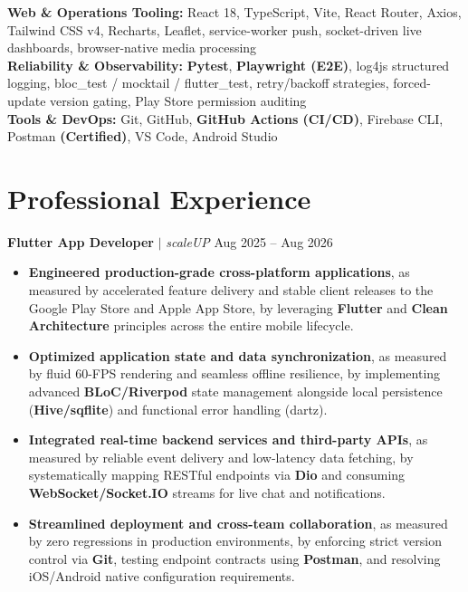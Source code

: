 \documentclass[10pt,letterpaper]{article}
\newenvironment{highlights}{
  \begin{itemize}[topsep=2pt,parsep=1pt,partopsep=0pt,itemsep=0pt,leftmargin=10pt]
}{\end{itemize}}
\begin{document}
\textbf{Web \& Operations Tooling:} React 18, TypeScript, Vite, React Router, Axios, Tailwind CSS v4, Recharts, Leaflet, service-worker push, socket-driven live dashboards, browser-native media processing \\[2pt]
\textbf{Reliability \& Observability:} \textbf{Pytest}, \textbf{Playwright (E2E)}, log4js structured logging, bloc\_test / mocktail / flutter\_test, retry/backoff strategies, forced-update version gating, Play Store permission auditing \\[2pt]
\textbf{Tools \& DevOps:} Git, GitHub, \textbf{GitHub Actions (CI/CD)}, Firebase CLI, Postman \textbf{(Certified)}, VS Code, Android Studio

\vspace{5pt}

\section{Professional Experience}

\textbf{Flutter App Developer} $|$ \textit{scaleUP} \hfill Aug 2025 -- Aug 2026\\
\vspace{-8pt}
\begin{highlights}
  \item \textbf{Engineered production-grade cross-platform applications}, as measured by accelerated feature delivery and stable client releases to the Google Play Store and Apple App Store, by leveraging \textbf{Flutter} and \textbf{Clean Architecture} principles across the entire mobile lifecycle.
  \item \textbf{Optimized application state and data synchronization}, as measured by fluid 60-FPS rendering and seamless offline resilience, by implementing advanced \textbf{BLoC/Riverpod} state management alongside local persistence (\textbf{Hive/sqflite}) and functional error handling (dartz).
  \item \textbf{Integrated real-time backend services and third-party APIs}, as measured by reliable event delivery and low-latency data fetching, by systematically mapping RESTful endpoints via \textbf{Dio} and consuming \textbf{WebSocket/Socket.IO} streams for live chat and notifications.
  \item \textbf{Streamlined deployment and cross-team collaboration}, as measured by zero regressions in production environments, by enforcing strict version control via \textbf{Git}, testing endpoint contracts using \textbf{Postman}, and resolving iOS/Android native configuration requirements.
\end{highlights}
\end{document}
